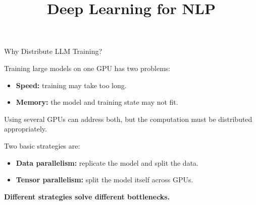 \documentclass[11pt,compress,t,notes=noshow, xcolor=table]{beamer}
\title{Deep Learning for NLP}
\begin{document}



\begin{vbframe}{Why Distribute LLM Training?}

Training large models on one GPU has two problems:

\begin{itemize}
    \item \textbf{Speed:} training may take too long.
    \item \textbf{Memory:} the model and training state may not fit.
\end{itemize}

Using several GPUs can address both, but the computation must be
distributed appropriately.

Two basic strategies are:

\begin{itemize}
    \item \textbf{Data parallelism:} replicate the model and split the data.
    \item \textbf{Tensor parallelism:} split the model itself across GPUs.
\end{itemize}

\begin{center}
\textbf{Different strategies solve different bottlenecks.}
\end{center}

\end{vbframe}
\end{document}
